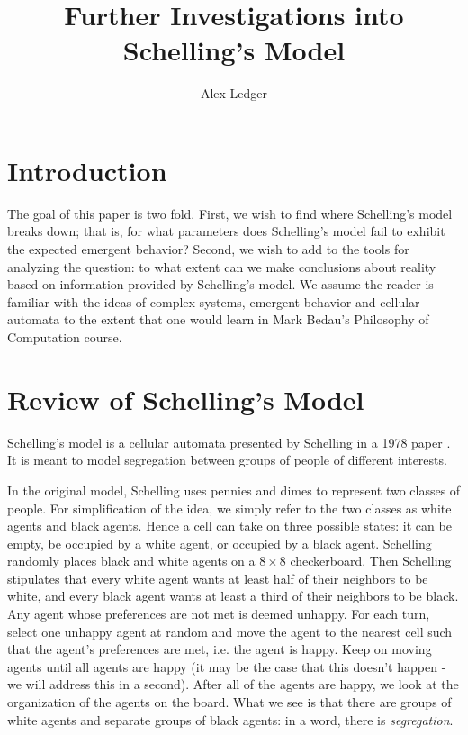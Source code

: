 \documentclass[11pt,twoside]{amsart}
\title{Further Investigations into Schelling's Model}
\author{Alex Ledger}
\date{}
\theoremstyle{theorem}
\theoremstyle{definition}
\theoremstyle{remark}
\begin{document}
\maketitle
\tableofcontents

\newpage

\section{Introduction}
The goal of this paper is two fold. 
First, we wish to find where Schelling's model breaks down; that is, for what parameters does Schelling's model fail to exhibit the expected emergent behavior?
Second, we wish to add to the tools for analyzing the question: to what extent can we make conclusions about reality based on information provided by Schelling's model.
We assume the reader is familiar with the ideas of complex systems, emergent behavior and cellular automata to the extent that one would learn in Mark Bedau's Philosophy of Computation course. 

\section{Review of Schelling's Model}
Schelling's model is a cellular automata presented by Schelling in a 1978 paper \cite{schelling}. 
It is meant to model segregation between groups of people of different interests. 

In the original model, Schelling uses pennies and dimes to represent two classes of people. 
For simplification of the idea, we simply refer to the two classes as white agents and black agents. 
Hence a cell can take on three possible states: it can be empty, be occupied by a white agent, or occupied by a black agent. 
Schelling randomly places black and white agents on a $8 \times 8$ checkerboard. 
Then Schelling stipulates that every white agent wants at least half of their neighbors to be white, and every black agent wants at least a third of their neighbors to be black.
Any agent whose preferences are not met is deemed unhappy. 
For each turn, select one unhappy agent at random and move the agent to the nearest cell such that the agent's preferences are met, i.e. the agent is happy.
Keep on moving agents until all agents are happy (it may be the case that this doesn't happen - we will address this in a second). 
After all of the agents are happy, we look at the organization of the agents on the board. 
What we see is that there are groups of white agents and separate groups of black agents: in a word, there is \emph{segregation}.
\end{document}
